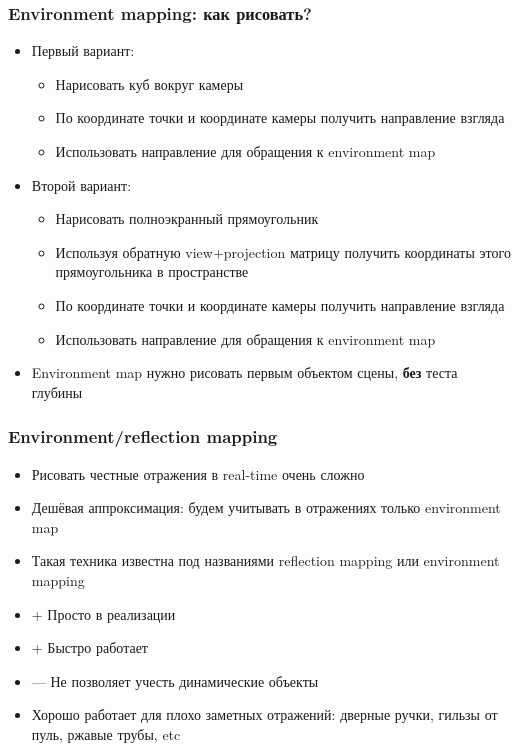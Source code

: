 \documentclass{beamer}
\begin{document}
\begin{frame}[fragile]
\frametitle{Environment mapping: как рисовать?}
\begin{itemize}
\item Первый вариант:
\pause
\begin{itemize}
\item Нарисовать куб вокруг камеры
\pause
\item По координате точки и координате камеры получить направление взгляда
\pause
\item Использовать направление для обращения к environment map
\end{itemize}
\pause
\item Второй вариант:
\begin{itemize}
\item Нарисовать полноэкранный прямоугольник
\pause
\item Используя обратную view+projection матрицу получить координаты этого прямоугольника в пространстве
\pause
\item По координате точки и координате камеры получить направление взгляда
\pause
\item Использовать направление для обращения к environment map
\end{itemize}
\pause
\item Environment map нужно рисовать первым объектом сцены, \textbf{без} теста глубины
\end{itemize}
\end{frame}

\begin{frame}[fragile]
\frametitle{Environment/reflection mapping}
\begin{itemize}
\item Рисовать честные отражения в real-time очень сложно
\pause
\item Дешёвая аппроксимация: будем учитывать в отражениях только environment map
\pause
\item Такая техника известна под названиями reflection mapping или environment mapping
\pause
\item {\color{green}+} Просто в реализации
\item {\color{green}+} Быстро работает
\item {\color{red}—} Не позволяет учесть динамические объекты
\pause
\item Хорошо работает для плохо заметных отражений: дверные ручки, гильзы от пуль, ржавые трубы, etc
\end{itemize}
\end{frame}
\end{document}
